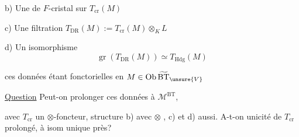 b) Une   de $F$-cristal sur $T_{\mathrm{cr}}(M)$

c) Une filtration  $T_{\mathrm{DR}}(M):=T_{\mathrm{cr}}(M)\otimes_K L$

d) Un isomorphisme
\[
\operatorname{gr}(T_{\mathrm{DR}}(M))\simeq T_{\mathrm{Hdg}}(M)
\]

ces données étant fonctorielles en $M\in\operatorname{Ob}\widetilde{\mathrm{BT}}_{\unsure{V}}$

\uline{Question} Peut-on prolonger ces données à $\mathcal M^{\mathrm{BT}}$, 

avec $T_{\mathrm{cr}}$ un $\otimes$-foncteur,  structure b)  avec $\otimes$ , c) et d) aussi. A-t-on unicité de $T_{\mathrm{cr}}$ prolongé, à isom unique près?
